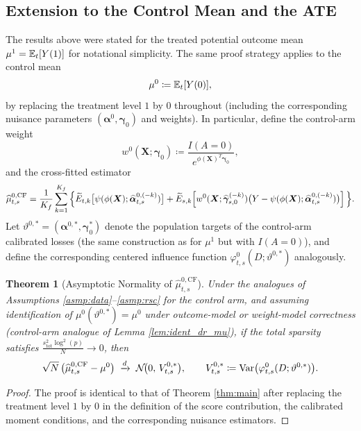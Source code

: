 \documentclass{article}
\newtheorem{theorem}{Theorem}[section]
\begin{document}
\subsection{Extension to the Control Mean and the ATE}\label{sec:ate_extension}

The results above were stated for the treated potential outcome mean $\mu^1=\operatorname{\mathbb{E}}_t[Y(1)]$ for notational simplicity. The same proof strategy applies to the control mean
\[
\mu^0 \coloneqq \operatorname{\mathbb{E}}_t[Y(0)],
\]
by replacing the treatment level $1$ by $0$ throughout (including the corresponding nuisance parameters $(\boldsymbol{\alpha}^0,\boldsymbol{\gamma}_0)$ and weights).
In particular, define the control-arm weight
\[
w^{0}(\boldsymbol{X};\boldsymbol{\gamma}_0)\coloneqq \frac{I(A=0)}{e^{\phi(\boldsymbol{X})^T \boldsymbol{\gamma}_0}},
\]
and the cross-fitted estimator
\[
\widehat{\mu}^{0,\mathrm{CF}}_{t,s}
= \frac{1}{K_f}\sum_{k=1}^{K_f}
\Big\{
    \widetilde{E}_{t,k}\big[\psi(\phi(\boldsymbol{X}); \widehat{\boldsymbol{\alpha}}_{t,s}^{0,(-k)})\big]
    + \widetilde{E}_{s,k}\!\left[
        w^{0}(\boldsymbol{X};\widehat{\boldsymbol{\gamma}}_{s,0}^{(-k)})
        \big(Y - \psi(\phi(\boldsymbol{X}); \widehat{\boldsymbol{\alpha}}_{t,s}^{0,(-k)})\big)
    \right]
\Big\}.
\]
Let $\vartheta^{0,*}=(\boldsymbol{\alpha}^{0,*},\boldsymbol{\gamma}_0^*)$ denote the population targets of the control-arm calibrated losses (the same construction as for $\mu^1$ but with $I(A=0)$), and define the corresponding centered influence function $\varphi^{0}_{t,s}(D;\vartheta^{0,*})$ analogously.

\begin{theorem}[Asymptotic Normality of $\widehat{\mu}^{0,\mathrm{CF}}_{t,s}$]\label{thm:main_mu0}
Under the analogues of Assumptions \ref{asmp:data}--\ref{asmp:rsc} for the control arm, and assuming identification of $\mu^0(\vartheta^{0,*})=\mu^0$ under outcome-model or weight-model correctness (control-arm analogue of Lemma \ref{lem:ident_dr_mu}), if the total sparsity satisfies $\frac{s_{\mathrm{tot}}^2\log^2(p)}{N}\to 0$, then
\[
\sqrt{N}\,\big(\widehat{\mu}^{0,\mathrm{CF}}_{t,s} - \mu^0\big)
\;\xrightarrow{d}\;
\mathcal{N}\!\big(0,\,V^{0,*}_{t,s}\big),
\qquad
V^{0,*}_{t,s}\coloneqq \operatorname{Var}\!\big(\varphi^{0}_{t,s}(D;\vartheta^{0,*})\big).
\]
\end{theorem}

\begin{proof}
The proof is identical to that of Theorem \ref{thm:main} after replacing the treatment level $1$ by $0$ in the definition of the score contribution, the calibrated moment conditions, and the corresponding nuisance estimators.
\end{proof}
\end{document}
